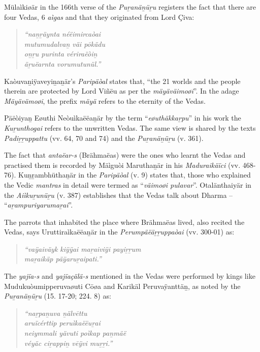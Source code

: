 Mülaìkiøär in the 166th verse of the \textit{Puṟanäṉüṟu} registers the fact that there are four Vedas, 6 \textit{aìgas} and that they originated from Lord Çiva:

\begin{verse}
\textit{“naṉṟäynta néëimircaòai}\\\textit{mutumudalvaṉ väi pōkädu}\\\textit{oṉṟu purinta vériraëòiṉ}\\\textit{äṟuëarnta vorumutunül.”}
\end{verse}

Kaòuvaṉiÿaveyiṉaṉär’s \textit{Paripäòal} states that, “the 21 worlds and the people therein are protected by Lord Viñëu as per the \textit{mäyäväimoøi}”. In the adage \textit{Mäyävämoøi}, the prefix \textit{mäyä} refers to the eternity of the Vedas.

Päëòiyaṉ Eøuthi Neòuìkaëëaṉär by the term “\textit{eøuthäkkaṟpu}” in his work the \textit{Kuṟunthogai} refers to the unwritten Vedas. The same view is shared by the texts \textit{Padiṟṟuppattu} (vv. 64, 70 and 74) and the \textit{Puṟanäṉüṟu} (v. 361).

The fact that \textit{antaëar-s} (Brähmaëas) were the ones who learnt the Vedas and practised them is recorded by Mäìguòi Maruthaṉär in his \textit{Maduraikäïci} (vv. 468-76). Kuṉṟambhüthaṉär in the \textit{Paripäòal} (v. 9) states that, those who explained the Vedic \textit{mantras} in detail were termed as “\textit{väimoøi pulavar}”. Otalänthaiyär in the \textit{Aiìkuṟunüṟu} (v. 387) establishes that the Vedas talk about Dharma – “\textit{aṟampuriyarumaṟai}”.

The parrots that inhabited the place where Brähmaëas lived, also recited the Vedas, says Uruttiraìkaëëaṉär in the \textit{Perumpäëäṟṟuppaòai} (vv. 300-01) as:

\begin{verse}
\textit{“vaÿaiväyk kiÿÿai maṟaiviÿi payiṟṟum}\\\textit{ maṟaikäp päÿaruṟaipati.”}
\end{verse}

The \textit{yajïa-s} and \textit{yajïaçälä-s} mentioned in the Vedas were performed by kings like Mudukuòumipperuvaøuti Cōøa and Karikäl Peruvaÿanttäṉ, as noted by the \textit{Puṟanäṉüṟu} (15. 17-20; 224. 8) as:

\begin{verse}
\textit{“naṟpaṉuva ṉälvēttu}\\\textit{ aruïcérttip peruìkaëëuṟai}\\\textit{neiymmali yävuti poìkap paṉmäë}\\\textit{véyäc ciṟappiṉ vēÿvi muṟṟi.”}
\end{verse}

